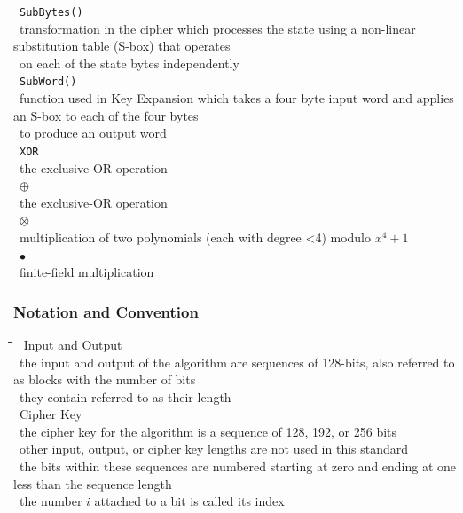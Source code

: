 \documentclass[10pt,letterpaper]{scrartcl}
\newcommand{\tbul}{\textbullet}
\newcommand{\tend}{\>\textendash}
\newcommand{\tabDef}{\hspace{2em}\=\hspace{2em}\=\hspace{2em}\=\hspace{2em}\=\kill}
\begin{document}
\begin{tabbing}
\tbul\ \texttt{SubBytes()} \\
    \tend\ transformation in the cipher which processes the state using a non-linear substitution table (S-box) that operates\\ \>\ on each of the state bytes independently \\
\tbul\ \texttt{SubWord()} \\
    \tend\ function used in Key Expansion which takes a four byte input word and applies an S-box to each of the four bytes\\ \>\ to produce an output word \\
\tbul\ \texttt{XOR} \\
    \tend\ the exclusive-OR operation \\ 
\tbul\ \texttt{$\oplus$} \\
    \tend\ the exclusive-OR operation \\
\tbul\ \texttt{$\otimes$} \\
    \tend\ multiplication of two polynomials (each with degree \textless 4) modulo $x^4 + 1$ \\
\tbul\ \texttt{$\bullet$} \\
    \tend\ finite-field multiplication\end{tabbing}
\subsubsection*{Notation and Convention}\begin{tabbing}\tabDef
\tbul\ Input and Output \\
    \tend\ the input and output of the algorithm are sequences of 128-bits, also referred to as blocks with the number of bits\\ \>\ they contain referred to as their length \\
\tbul\ Cipher Key \\
    \tend\ the cipher key for the algorithm is a sequence of 128, 192, or 256 bits\\
\tbul\ other input, output, or cipher key lengths are not used in this standard \\ 
\tbul\ the bits within these sequences are numbered starting at zero and ending at one less than the sequence length \\
\tbul\ the number $i$ attached to a bit is called its index\end{tabbing}
\end{document}
